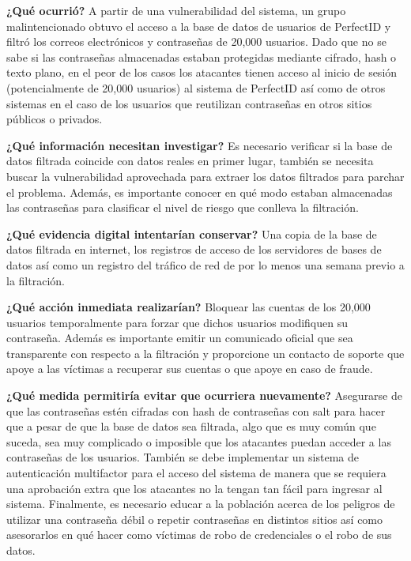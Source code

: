 \begin{enumerateColor}
    \item \textbf{¿Qué ocurrió?}
A partir de una vulnerabilidad del sistema, un grupo malintencionado obtuvo el acceso a la base de datos de usuarios de PerfectID y filtró los correos electrónicos y contraseñas de 20,000 usuarios. Dado que no se sabe si las contraseñas almacenadas estaban protegidas mediante cifrado, hash o texto plano, en el peor de los casos los atacantes tienen acceso al inicio de sesión (potencialmente de 20,000 usuarios) al sistema de PerfectID así como de otros sistemas en el caso de los usuarios que reutilizan contraseñas en otros sitios públicos o privados.
    \item \textbf{¿Qué información necesitan investigar?}
	    Es necesario verificar si la base de datos filtrada coincide con datos reales en primer lugar, también se necesita buscar la vulnerabilidad aprovechada para extraer los datos filtrados para parchar el problema. Además, es importante conocer en qué modo estaban almacenadas las contraseñas para clasificar el nivel de riesgo que conlleva la filtración.

    \item \textbf{¿Qué evidencia digital intentarían conservar?}
	    Una copia de la base de datos filtrada en internet, los registros de acceso de los servidores de bases de datos así como un registro del tráfico de red de por lo menos una semana previo a la filtración.

    \item \textbf{¿Qué acción inmediata realizarían?}
	   Bloquear las cuentas de los 20,000 usuarios temporalmente para forzar que dichos usuarios modifiquen su contraseña. Además es importante emitir un comunicado oficial que sea transparente con respecto a la filtración y proporcione un contacto de soporte que apoye a las víctimas a recuperar sus cuentas o que apoye en caso de fraude. 

    \item \textbf{¿Qué medida permitiría evitar que ocurriera nuevamente?}
	    Asegurarse de que las contraseñas estén cifradas con hash de contraseñas con salt para hacer que a pesar de que la base de datos sea filtrada, algo que es muy común que suceda, sea muy complicado o imposible que los atacantes puedan acceder a las contraseñas de los usuarios. También se debe implementar un sistema de autenticación multifactor para el acceso del sistema de manera que se requiera una aprobación extra que los atacantes no la tengan tan fácil para ingresar al sistema. Finalmente, es necesario educar a la población acerca de los peligros de utilizar una contraseña débil o repetir contraseñas en distintos sitios así como asesorarlos en qué hacer como víctimas de robo de credenciales o el robo de sus datos.
\end{enumerateColor}

